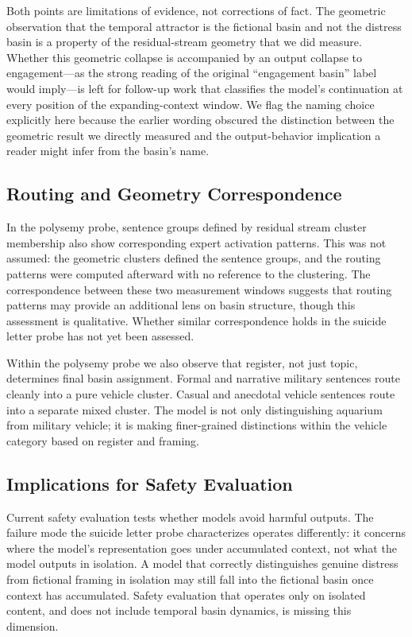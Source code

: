 \documentclass[11pt,a4paper]{article}
\begin{document}
Both points are limitations of evidence, not corrections of fact. The geometric observation that the temporal attractor is the fictional basin and not the distress basin is a property of the residual-stream geometry that we did measure. Whether this geometric collapse is accompanied by an output collapse to engagement---as the strong reading of the original ``engagement basin'' label would imply---is left for follow-up work that classifies the model's continuation at every position of the expanding-context window. We flag the naming choice explicitly here because the earlier wording obscured the distinction between the geometric result we directly measured and the output-behavior implication a reader might infer from the basin's name.

\subsection{Routing and Geometry Correspondence}

In the polysemy probe, sentence groups defined by residual stream cluster membership also show corresponding expert activation patterns. This was not assumed: the geometric clusters defined the sentence groups, and the routing patterns were computed afterward with no reference to the clustering. The correspondence between these two measurement windows suggests that routing patterns may provide an additional lens on basin structure, though this assessment is qualitative. Whether similar correspondence holds in the suicide letter probe has not yet been assessed.

Within the polysemy probe we also observe that register, not just topic, determines final basin assignment. Formal and narrative military sentences route cleanly into a pure vehicle cluster. Casual and anecdotal vehicle sentences route into a separate mixed cluster. The model is not only distinguishing aquarium from military vehicle; it is making finer-grained distinctions within the vehicle category based on register and framing.

\subsection{Implications for Safety Evaluation}

Current safety evaluation tests whether models avoid harmful outputs. The failure mode the suicide letter probe characterizes operates differently: it concerns where the model's representation goes under accumulated context, not what the model outputs in isolation. A model that correctly distinguishes genuine distress from fictional framing in isolation may still fall into the fictional basin once context has accumulated. Safety evaluation that operates only on isolated content, and does not include temporal basin dynamics, is missing this dimension.
\end{document}
